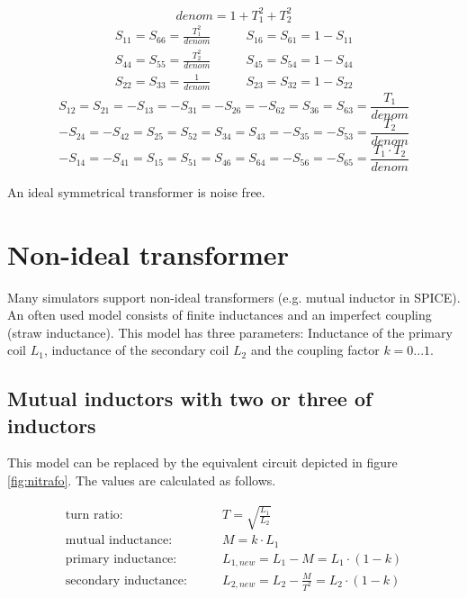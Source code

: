 \begin{equation}
denom = 1+T_1^2+T_2^2
\end{equation}
\begin{eqnarray}
S_{11} = S_{66} = \frac{T_1^2}{denom}  &  \qquad S_{16} = S_{61} = 1-S_{11} \\
S_{44} = S_{55} = \frac{T_2^2}{denom}  &  \qquad S_{45} = S_{54} = 1-S_{44} \\
S_{22} = S_{33} = \frac{1}{denom}  &  \qquad S_{23} = S_{32} = 1-S_{22}
\end{eqnarray}
\begin{equation}
S_{12} = S_{21} = -S_{13} = -S_{31} = -S_{26} = -S_{62} = S_{36} = S_{63}
       = \frac{T_1}{denom}
\end{equation}
\begin{equation}
-S_{24} = -S_{42} = S_{25} = S_{52} = S_{34} = S_{43} = -S_{35} = -S_{53}
       = \frac{T_2}{denom}
\end{equation}
\begin{equation}
-S_{14} = -S_{41} = S_{15} = S_{51} = S_{46} = S_{64} = -S_{56} = -S_{65}
       = \frac{T_1\cdot T_2}{denom}
\end{equation}

An ideal symmetrical transformer is noise free.


\section{Non-ideal transformer}

Many simulators support non-ideal transformers (e.g. mutual inductor
in SPICE).  An often used model consists of finite inductances and an
imperfect coupling (straw inductance).  This model has three
parameters: Inductance of the primary coil $L_1$, inductance of the
secondary coil $L_2$ and the coupling factor $k=0...1$.

\subsection{Mutual inductors with two or three of inductors}

This model can be replaced by the equivalent circuit depicted in
figure \ref{fig:nitrafo}.  The values are calculated as follows.

\begin{align}
\textrm{turn ratio:} & \qquad  T = \sqrt{\frac{L_1}{L_2}}\\
\textrm{mutual inductance:}  & \qquad M = k\cdot L_1\\
\textrm{primary inductance:}  & \qquad L_{1,new} = L_1 - M = L_1\cdot (1-k)\\
\textrm{secondary inductance:}  & \qquad L_{2,new} = L_2 - \frac{M}{T^2} = L_2\cdot (1-k)
\end{align}

